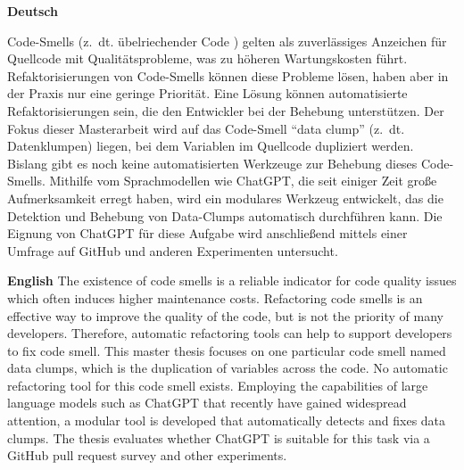 \textbf{Deutsch}
\begin{comment}
Data-Clumps (z.~dt. Datenklumpen) sind ein häufig vorkommendes Indiz für schlechte Codequalität. Viele Data-Clumps werden nicht behoben, da dies nicht die Priorität der Entwickler ist und die Behebung zeitaufwendig sein kann. Eine alternative Möglichkeit zur Behebung von Data-Clumps sind automatisierte Refaktorisierungen. Hierfür gibt es aber noch keine passenden Tools. Ziel dieser Masterarbeit ist es, ein modulares Programm zu entwickeln, dass Data-Clumps findet und refaktorisiert, indem andere Programme und Dienste verwendet und kombiniert werden. Dabei soll ein Austausch von Programmen und Diensten so leicht wie möglich gemacht werden. Ein großer Fokus der Masterarbeit wird die Integration des Sprachmodells ChatGPT sein, welches als Dienst zur Verfügung gestellt werden, um zu prüfen, ob es Data-Clumps effektiv finden und refaktorisieren kann.
\end{comment}
Code-Smells (z.~dt. übelriechender Code ) gelten als zuverlässiges Anzeichen für Quellcode mit Qualitätsprobleme, was zu höheren Wartungskosten führt. Refaktorisierungen von Code-Smells können diese Probleme lösen, haben aber in der Praxis nur eine geringe Priorität. Eine Lösung können automatisierte Refaktorisierungen sein, die den Entwickler bei der Behebung unterstützen. Der Fokus dieser Masterarbeit wird auf das Code-Smell \enquote{data clump} (z.~dt. Datenklumpen) liegen, bei dem Variablen im Quellcode dupliziert werden. Bislang gibt es noch keine automatisierten Werkzeuge zur Behebung dieses Code-Smells. Mithilfe vom Sprachmodellen wie ChatGPT, die  seit einiger Zeit große Aufmerksamkeit erregt haben,  wird ein modulares Werkzeug entwickelt, das die Detektion und Behebung von Data-Clumps automatisch durchführen kann.  Die Eignung von ChatGPT für diese Aufgabe wird  anschließend mittels einer Umfrage auf GitHub und anderen Experimenten untersucht. 
\bigskip

\noindent
\textbf{English} 
The existence of code smells is a reliable indicator for code quality issues which often induces higher maintenance costs. Refactoring code smells is an effective way to improve the quality of the code, but is not the priority of many developers.  Therefore, automatic refactoring tools can help to support developers to fix code smell. This master thesis focuses on one particular code  smell named data clumps, which is the duplication of variables across the code. No automatic refactoring tool for this code smell exists. Employing the capabilities of large language models such as ChatGPT that  recently have gained widespread attention, a modular tool is developed  that automatically detects and fixes data clumps. The thesis evaluates whether ChatGPT is suitable for this task via a GitHub pull request survey and other experiments. 

